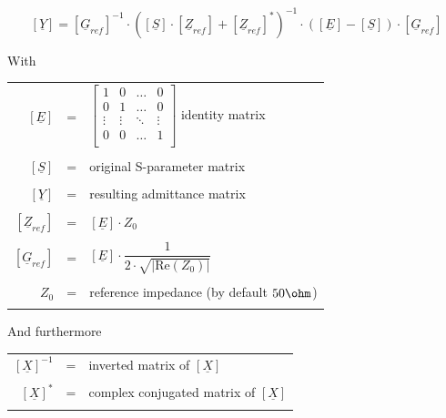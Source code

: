 \documentclass[10pt]{report}
\begin{document}
\begin{equation}
\left[
\underline{Y}
\right]
=
\left[
\underline{G}_{ref}
\right]^{-1}
\cdot
\left(
\left[\underline{S}\right] \cdot \left[\underline{Z}_{ref}\right] + \left[\underline{Z}_{ref}\right]^{*}
\right)^{-1}
\cdot
\left(
\left[\underline{E}\right] - \left[\underline{S}\right]
\right)
\cdot
\left[\underline{G}_{ref}\right]
\end{equation}

With

\addvspace{12pt}

\begin{tabular}{rll}
$\left[\underline{E}\right]$ & = &
$\begin{bmatrix}
1 & 0 & \ldots & 0\\
0 & 1 & \ldots & 0\\
\vdots & \vdots & \ddots & \vdots\\
0 & 0 & \ldots & 1\\
\end{bmatrix}$
identity matrix\\& &\\
$\left[\underline{S}\right]$ & = & original S-parameter matrix\\& &\\
$\left[\underline{Y}\right]$ & = & resulting admittance matrix\\& &\\
$\left[\underline{Z}_{ref}\right]$ & = &
$\left[\underline{E}\right] \cdot Z_{0}$\\& &\\
$\left[\underline{G}_{ref}\right]$ & = &
$\left[\underline{E}\right] \cdot 
\dfrac{1}{2\cdot \sqrt{\left| \text{Re}\left(Z_{0}\right)\right|}}$\\& &\\
$Z_{0}$ & = & reference impedance (by default $50\ohm$)\\& &\\
\end{tabular}

And furthermore

\addvspace{12pt}

\begin{tabular}{rll}
$\left[\underline{X}\right]^{-1}$ & = & 
inverted matrix of $\left[\underline{X}\right]$\\& &\\
$\left[\underline{X}\right]^{*}$ & = & 
complex conjugated matrix of $\left[\underline{X}\right]$\\& &\\
\end{tabular}
\end{document}
